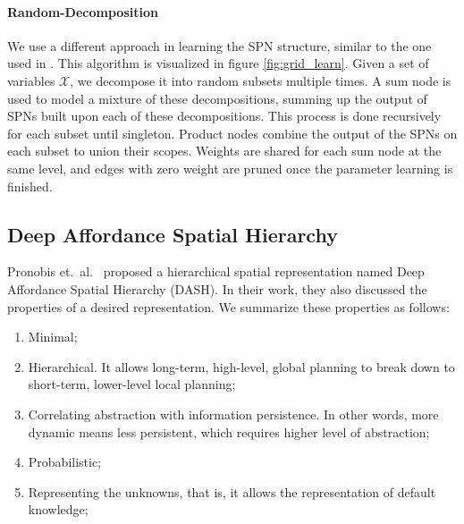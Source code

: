 \documentclass[10pt, titlepage]{article}
\theoremstyle{definition}
\begin{document}
\paragraph{Random-Decomposition}\label{sc:rand}
We use a different approach in learning the SPN structure, similar to the one used in \cite{pronobis2016learning}. This algorithm is visualized in figure \ref{fig:grid_learn}. Given a set of variables $\mathcal{X}$, we decompose it into random subsets multiple times. A sum node is used to model a mixture of these decompositions, summing up the output of SPNs built upon each of these decompositions. This process is done recursively for each subset until singleton. Product nodes combine the output of the SPNs on each subset to union their scopes. Weights are shared for each sum node at the same level, and edges with zero weight are pruned once the parameter learning is finished.

\subsection{Deep Affordance Spatial Hierarchy}\label{section:dash}

Pronobis et.~al.~\cite{pronobis2017deep} proposed a hierarchical spatial representation named Deep Affordance Spatial Hierarchy (DASH). In their work, they also discussed the properties of a desired representation. We summarize these properties as follows: 

\begin{enumerate}[label=(\arabic*)]
    \item Minimal;
    \item Hierarchical. It allows long-term, high-level, global planning to break down to short-term, lower-level local planning;
    \item Correlating abstraction with information persistence. In other words, more dynamic means less persistent, which requires higher level of abstraction;
    \item Probabilistic;
    \item Representing the unknowns, that is, it allows the representation of default knowledge;
\end{enumerate}
\end{document}

